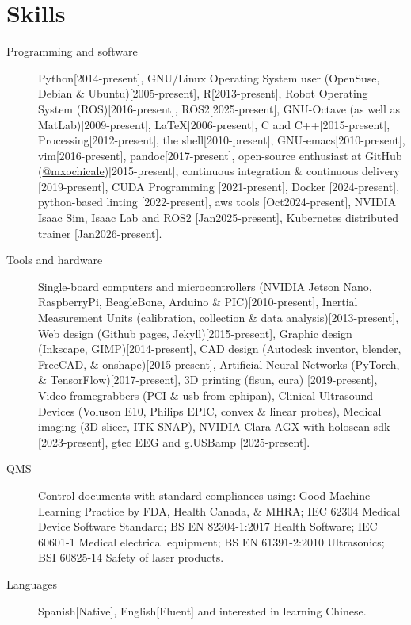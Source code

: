 \documentclass{mycv}
\begin{document}
\section{Skills}
\begin{description}

\item[Programming and software] Python[2014-present],
GNU/Linux Operating System user (OpenSuse, Debian \& Ubuntu)[2005-present], 
R[2013-present], 
Robot Operating System (ROS)[2016-present],
ROS2[2025-present],
GNU-Octave (as well as MatLab)[2009-present],
\LaTeX [2006-present], 
C and C++[2015-present],
Processing[2012-present], 
the shell[2010-present], 
GNU-emacs[2010-present],
vim[2016-present], 
pandoc[2017-present],
open-source enthusiast at GitHub (\href{https://github.com/mxochicale}{@mxochicale})[2015-present], 
continuous integration \& continuous delivery [2019-present], 
CUDA Programming [2021-present], 
Docker [2024-present],
python-based linting [2022-present],
aws tools \href{https://github.com/UCL-CDI/cdi-hub/tree/main/tutorials/aws-services/aws-batch}{\faGithub*} [Oct2024-present],
NVIDIA Isaac Sim, Isaac Lab and ROS2 \href{https://github.com/mxochicale/nvidia-open-source-robot-lab}{\faGithub*} [Jan2025-present],
Kubernetes distributed trainer [Jan2026-present].

\item[Tools and hardware] 
Single-board computers and microcontrollers (NVIDIA Jetson Nano, RaspberryPi, BeagleBone, Arduino \& PIC)[2010-present],
Inertial Measurement Units (calibration, collection \& data analysis)[2013-present], 
Web design (Github pages, Jekyll)[2015-present], 
Graphic design (Inkscape, GIMP)[2014-present],
CAD design (Autodesk inventor, blender, FreeCAD, \& onshape)[2015-present], 
Artificial Neural Networks (PyTorch, \& TensorFlow)[2017-present], 
3D printing (flsun, cura) [2019-present], 
Video framegrabbers (PCI \& usb from ephipan),
Clinical Ultrasound Devices (Voluson E10, Philips EPIC, convex \& linear probes), 
Medical imaging (3D slicer, ITK-SNAP), 
NVIDIA Clara AGX with holoscan-sdk [2023-present],
gtec EEG and g.USBamp [2025-present].

\item[QMS] 
Control documents with standard compliances using:
Good Machine Learning Practice by FDA, Health Canada, \& MHRA;
IEC 62304 Medical Device Software Standard;
BS EN 82304-1:2017 Health Software;
IEC 60601-1 Medical electrical equipment; 
BS EN 61391-2:2010 Ultrasonics;
BSI 60825-14 Safety of laser products.

\item[Languages] Spanish[Native], English[Fluent] and interested in learning Chinese.
 
\end{description}
\end{document}
